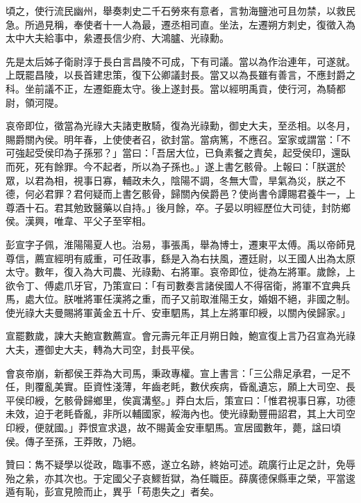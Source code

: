 \begin{pinyinscope}
頃之，使行流民幽州，舉奏刺史二千石勞來有意者，言勃海鹽池可且勿禁，以救民急。所過見稱，奉使者十一人為最，遷丞相司直。坐法，左遷朔方刺史，復徵入為太中大夫給事中，絫遷長信少府、大鴻臚、光祿勳。

先是太后姊子衛尉淳于長白言昌陵不可成，下有司議。當以為作治連年，可遂就。上既罷昌陵，以長首建忠策，復下公卿議封長。當又以為長雖有善言，不應封爵之科。坐前議不正，左遷鉅鹿太守。後上遂封長。當以經明禹貢，使行河，為騎都尉，領河隄。

哀帝即位，徵當為光祿大夫諸吏散騎，復為光祿勳，御史大夫，至丞相。以冬月，賜爵關內侯。明年春，上使使者召，欲封當。當病篤，不應召。室家或謂當：「不可強起受侯印為子孫邪？」當曰：「吾居大位，已負素餐之責矣，起受侯印，還臥而死，死有餘罪。今不起者，所以為子孫也。」遂上書乞骸骨。上報曰：「朕選於眾，以君為相，視事日寡，輔政未久，陰陽不調，冬無大雪，旱氣為災，朕之不德，何必君罪？君何疑而上書乞骸骨，歸關內侯爵邑？使尚書令譚賜君養牛一，上尊酒十石。君其勉致醫藥以自持。」後月餘，卒。子晏以明經歷位大司徒，封防鄉侯。漢興，唯韋、平父子至宰相。

彭宣字子佩，淮陽陽夏人也。治易，事張禹，舉為博士，遷東平太傅。禹以帝師見尊信，薦宣經明有威重，可任政事，繇是入為右扶風，遷廷尉，以王國人出為太原太守。數年，復入為大司農、光祿勳、右將軍。哀帝即位，徙為左將軍。歲餘，上欲令丁、傅處爪牙官，乃策宣曰：「有司數奏言諸侯國人不得宿衛，將軍不宜典兵馬，處大位。朕唯將軍任漢將之重，而子又前取淮陽王女，婚姻不絕，非國之制。使光祿大夫曼賜將軍黃金五十斤、安車駟馬，其上左將軍印綬，以關內侯歸家。」

宣罷數歲，諫大夫鮑宣數薦宣。會元壽元年正月朔日蝕，鮑宣復上言乃召宣為光祿大夫，遷御史大夫，轉為大司空，封長平侯。

會哀帝崩，新都侯王莽為大司馬，秉政專權。宣上書言：「三公鼎足承君，一足不任，則覆亂美實。臣資性淺薄，年齒老眊，數伏疾病，昏亂遺忘，願上大司空、長平侯印綬，乞骸骨歸鄉里，俟寘溝壑。」莽白太后，策宣曰：「惟君視事日寡，功德未效，迫于老眊昏亂，非所以輔國家，綏海內也。使光祿勳豐冊詔君，其上大司空印綬，便就國。」莽恨宣求退，故不賜黃金安車駟馬。宣居國數年，薨，諡曰頃侯。傳子至孫，王莽敗，乃絕。

贊曰：雋不疑學以從政，臨事不惑，遂立名跡，終始可述。疏廣行止足之計，免辱殆之絫，亦其次也。于定國父子哀鰥哲獄，為任職臣。薛廣德保縣車之榮，平當逡遁有恥，彭宣見險而止，異乎「苟患失之」者矣。


\end{pinyinscope}